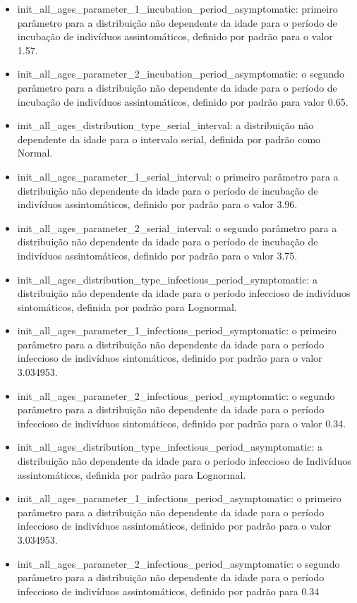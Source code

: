 \begin{itemize}
\item {init\_all\_ages\_parameter\_1\_incubation\_period\_asymptomatic}:  primeiro parâmetro para a distribuição não dependente da idade para o período de incubação de indivíduos assintomáticos, definido por padrão para o valor 1.57.
\item {init\_all\_ages\_parameter\_2\_incubation\_period\_asymptomatic}: o segundo parâmetro para a distribuição não dependente da idade para o período de incubação de indivíduos assintomáticos, definido por padrão para valor 0.65.
\item {init\_all\_ages\_distribution\_type\_serial\_interval}: a distribuição não dependente da idade para o intervalo serial, definida por padrão como Normal.
\item {init\_all\_ages\_parameter\_1\_serial\_interval}: o primeiro parâmetro para a distribuição não dependente da idade para o período de incubação de indivíduos assintomáticos, definido por padrão para o valor 3.96.
\item {init\_all\_ages\_parameter\_2\_serial\_interval}: o segundo parâmetro para a distribuição não dependente da idade para o período de incubação de indivíduos assintomáticos, definido por padrão para o valor 3.75.
\item {init\_all\_ages\_distribution\_type\_infectious\_period\_symptomatic}: a distribuição não dependente da idade para o período infeccioso de indivíduos sintomáticos, definida por padrão para Lognormal.
\item {init\_all\_ages\_parameter\_1\_infectious\_period\_symptomatic}: o primeiro parâmetro para a distribuição não dependente da idade para o período infeccioso de indivíduos sintomáticos, definido por padrão para o valor 3.034953.
\item {init\_all\_ages\_parameter\_2\_infectious\_period\_symptomatic}: o segundo parâmetro para a distribuição não dependente da idade para o período infeccioso de indivíduos sintomáticos, definido por padrão para o valor 0.34.
\item {init\_all\_ages\_distribution\_type\_infectious\_period\_asymptomatic}: a distribuição não dependente da idade para o período infeccioso de Indivíduos assintomáticos, definida por padrão para Lognormal.
\item {init\_all\_ages\_parameter\_1\_infectious\_period\_asymptomatic}: o primeiro parâmetro para a distribuição não dependente da idade para o período infeccioso de indivíduos assintomáticos, definido por padrão para o valor 3.034953.
\item {init\_all\_ages\_parameter\_2\_infectious\_period\_asymptomatic}: o segundo parâmetro para a distribuição não dependente da idade para o período infeccioso de indivíduos assintomáticos, definido por padrão para 0.34
\end{itemize}

